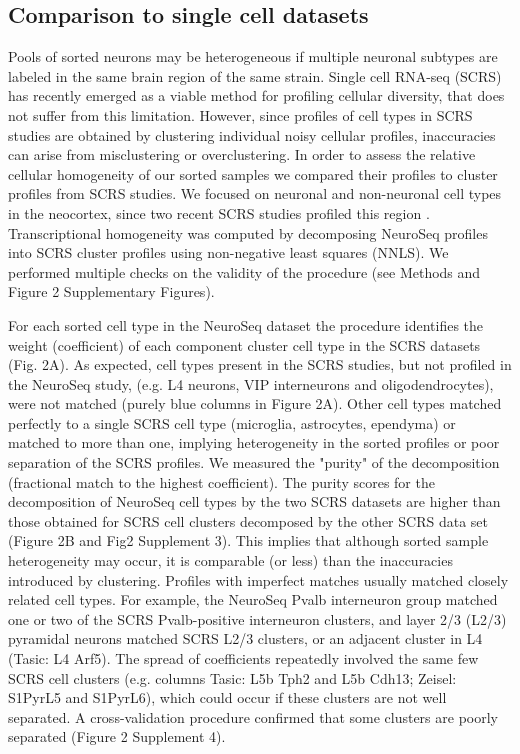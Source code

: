 \subsection{Comparison to single cell datasets}
Pools of sorted neurons may be heterogeneous if multiple neuronal subtypes are labeled in the same brain region of the same strain. Single cell RNA-seq (SCRS) has recently emerged as a viable method for profiling cellular diversity, that does not suffer from this limitation. However, since profiles of cell types in SCRS studies are obtained by clustering individual noisy cellular profiles, inaccuracies can arise from misclustering or overclustering. In order to assess the relative cellular homogeneity of our sorted samples we compared their profiles to cluster profiles from SCRS studies. We focused on neuronal and non-neuronal cell types in the neocortex, since two recent SCRS studies profiled this region \cite{Tasic_2016,Zeisel_2015}. Transcriptional homogeneity was computed by decomposing NeuroSeq profiles into SCRS cluster profiles using non-negative least squares (NNLS). We performed multiple checks on the validity of the procedure (see Methods and Figure 2 Supplementary Figures). 

For each sorted cell type in the NeuroSeq dataset the procedure identifies the weight (coefficient) of each component cluster cell type in the SCRS datasets (Fig. 2A). As expected, cell types present in the SCRS studies, but not profiled in the NeuroSeq study, (e.g. L4 neurons, VIP interneurons and oligodendrocytes), were not matched (purely blue columns in Figure 2A). Other cell types matched perfectly to a single SCRS cell type (microglia, astrocytes, ependyma) or matched to more than one, implying heterogeneity in the sorted profiles or poor separation of the SCRS profiles. We measured the "purity" of the decomposition (fractional match to the highest coefficient). The purity scores for the decomposition of NeuroSeq cell types by the two SCRS datasets are higher than those obtained for SCRS cell clusters decomposed by the other SCRS data set (Figure 2B and Fig2 Supplement 3). This implies that although sorted sample heterogeneity may occur, it is comparable (or less) than the inaccuracies introduced by clustering. Profiles with imperfect matches usually matched closely related cell types. For example, the NeuroSeq Pvalb interneuron group matched one or two of the SCRS Pvalb-positive interneuron clusters, and layer 2/3 (L2/3) pyramidal neurons matched SCRS L2/3 clusters, or an adjacent cluster in L4 (Tasic: L4 Arf5). The spread of coefficients repeatedly involved the same few SCRS cell clusters (e.g. columns Tasic: L5b Tph2 and L5b Cdh13; Zeisel: S1PyrL5 and S1PyrL6), which could occur if these clusters are not well separated. A cross-validation procedure confirmed that some clusters are poorly separated (Figure 2 Supplement 4).   

